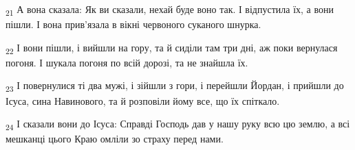\begin{tcolorbox}
\textsubscript{21} А вона сказала: Як ви сказали, нехай буде воно так. І відпустила їх, а вони пішли. І вона прив'язала в вікні червоного суканого шнурка.
\end{tcolorbox}
\begin{tcolorbox}
\textsubscript{22} І вони пішли, і вийшли на гору, та й сиділи там три дні, аж поки вернулася погоня. І шукала погоня по всій дорозі, та не знайшла їх.
\end{tcolorbox}
\begin{tcolorbox}
\textsubscript{23} І повернулися ті два мужі, і зійшли з гори, і перейшли Йордан, і прийшли до Ісуса, сина Навинового, та й розповіли йому все, що їх спіткало.
\end{tcolorbox}
\begin{tcolorbox}
\textsubscript{24} І сказали вони до Ісуса: Справді Господь дав у нашу руку всю цю землю, а всі мешканці цього Краю омліли зо страху перед нами.
\end{tcolorbox}
